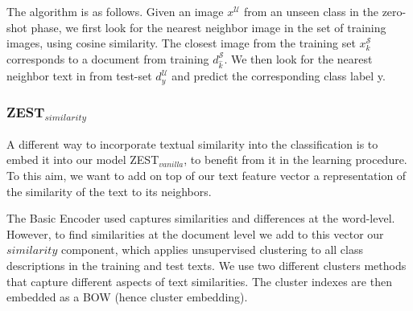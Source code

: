 \documentclass[11pt,a4paper]{article}
\newcommand\yuval[1]{\textcolor{darkpink}{\textbf{YUVAL:} #1 }}
\newcommand\reut[1]{\textcolor{green}{\textbf{REUT:} #1 }}
\begin{document}

The algorithm is as follows. Given an image $x^{\mathcal{U}}$ from an unseen class in the zero-shot phase,
we first look for the nearest neighbor image in the set of training images, using cosine similarity. The closest image from the training set $x^{\mathcal{S}}_k$ corresponds to a document from training $d^{\mathcal{S}}_{\hat{k}}$. We then look for the nearest neighbor text in from test-set $d^{\mathcal{U}}_y$ and predict the corresponding class label y.
 

\subsubsection{ZEST$_{similarity}$}
\label{section:similarity_component}

A different way to incorporate textual similarity into the classification is to embed it into our model ZEST$_{vanilla}$, to benefit from it in the learning procedure. To this aim, we want to add on top of our text feature vector a representation of the similarity of the text to its neighbors. \par


The Basic Encoder used captures similarities and differences at the word-level. However, to find similarities at the document level we add to this vector our $similarity$ component, %
which applies unsupervised clustering to all class descriptions in the training and test texts. We use two different clusters methods that capture different aspects of text similarities. The cluster indexes are then embedded as a BOW (hence cluster embedding). \par
\end{document}
